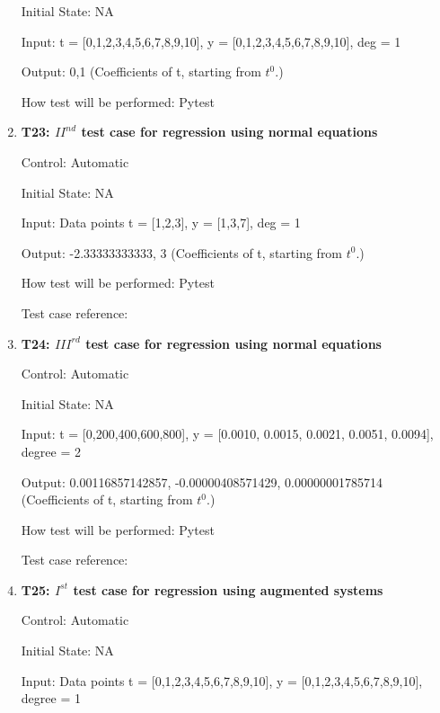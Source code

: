 \documentclass[12pt, titlepage]{article}
\begin{document}
\begin{enumerate}
Initial State: NA

Input: t = [0,1,2,3,4,5,6,7,8,9,10], y = [0,1,2,3,4,5,6,7,8,9,10], deg = 1 

Output: 0,1 (Coefficients of t, starting from $t^{0}$.)

How test will be performed: Pytest\\


\item{\textbf{T23: ${II}^{nd}$ test case for regression using normal 
equations}\\}

Control: Automatic

Initial State: NA

Input: Data points t = [1,2,3], y = [1,3,7], deg = 1

Output: -2.33333333333, 3 (Coefficients of t, starting from $t^{0}$.)

How test will be performed: Pytest

Test case reference: ~\cite{RegNormal}\\


\item{\textbf{T24: ${III}^{rd}$ test case for regression using normal equations 
}\\}

Control: Automatic

Initial State: NA

Input: t = [0,200,400,600,800], y = [0.0010, 0.0015, 0.0021, 0.0051, 0.0094], degree = 2

Output: 0.00116857142857, -0.00000408571429, 0.00000001785714 (Coefficients of t, starting from $t^{0}$.)

How test will be performed: Pytest

Test case reference:~\cite{RegNormal}\\



\item{\textbf{T25: $I^{st}$ test case for regression using augmented systems}\\}

Control: Automatic

Initial State: NA

Input: Data points t = [0,1,2,3,4,5,6,7,8,9,10], y = [0,1,2,3,4,5,6,7,8,9,10], degree = 1 


\end{enumerate}
\end{document}
